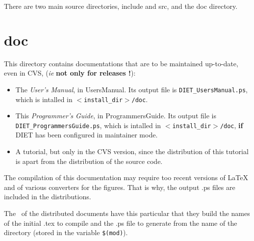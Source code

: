 

There are two main source directories, \textsf{include} and \textsf{src}, and
the \textsf{doc} directory.


\section{\textsf{doc}}
\label{s:doc}

This directory contains documentations that are to be maintained up-to-date,
even in CVS, (\emph{ie} \textbf{not only for releases !}):

\begin{itemize}
\item The \textit{User's Manual}, in \textsf{UsersManual}. Its output file is
  \texttt{DIET\_UsersManual.ps}, which is intalled in
  \texttt{$<$install\_dir$>$/doc}.
\item This \textit{Programmer's Guide}, in \textsf{ProgrammersGuide}. Its output
  file is \texttt{DIET\_ProgrammersGuide.ps}, which is intalled in
  \texttt{$<$install\_dir$>$/doc}, \textbf{if} DIET has been configured in
  maintainer mode.
\item A tutorial, but only in the CVS version, since the distribution of this
  tutorial is apart from the distribution of the source code.
\end{itemize}

The compilation of this documentation may require too recent versions of \LaTeX
and of various converters for the figures. That is why, the output \textsf{.ps}
files are included in the distributions.


The \makeam\ of the distributed documents have this particular that they build
the names of the initial \textsf{.tex} to compile and the \textsf{.ps} file to
generate from the name of the directory (stored in the variable \verb+$(mod)+).

